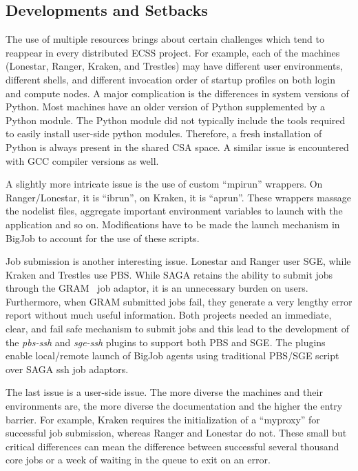 \documentclass{sig-alternate}
\begin{document}
\subsection{Developments and Setbacks}

The use of multiple resources brings about certain challenges which tend to reappear in 
every distributed ECSS project. For example, each of the machines (Lonestar, Ranger, 
Kraken, and Trestles) may have different user environments, different shells, and 
different invocation order of startup profiles on both login and compute nodes. A major 
complication is the differences in system versions of Python. Most machines have an older 
version of Python supplemented by a Python module. The Python module did not typically 
include the tools required to easily install user-side python modules. Therefore, a fresh 
installation of Python is always present in the shared CSA space. A similar issue is 
encountered with GCC compiler versions as well.

A slightly more intricate issue is the use of custom ``mpirun'' wrappers. On
Ranger/Lonestar, it is ``ibrun'', on Kraken, it is ``aprun''. These wrappers
massage the nodelist files, aggregate important environment variables to launch
with the application and so on. Modifications have to be made the launch
mechanism in BigJob to account for the use of these scripts.

Job submission is another interesting issue. Lonestar and Ranger user SGE, while
Kraken and Trestles use PBS. While SAGA retains the ability to submit jobs
through the GRAM~\cite{gram} job adaptor, it is an unnecessary burden on
users. Furthermore, when GRAM submitted jobs fail, they generate a very lengthy
error report without much useful information. Both projects needed an
immediate, clear, and fail safe mechanism to submit jobs and this lead to the
development of the \textit{pbs-ssh} and \textit{sge-ssh} plugins to support
both PBS and SGE. 
The plugins enable local/remote launch of BigJob agents using
traditional PBS/SGE script over SAGA ssh job adaptors.


The last issue is a user-side issue. The more diverse the machines and their
environments are, the more diverse the documentation and the higher the entry
barrier. For example, Kraken requires the initialization of a ``myproxy'' for
successful job submission, whereas Ranger and Lonestar do not.  These small  but
critical differences can mean the difference between successful several
thousand core jobs or a week of waiting in the queue to exit on an error.
\end{document}

